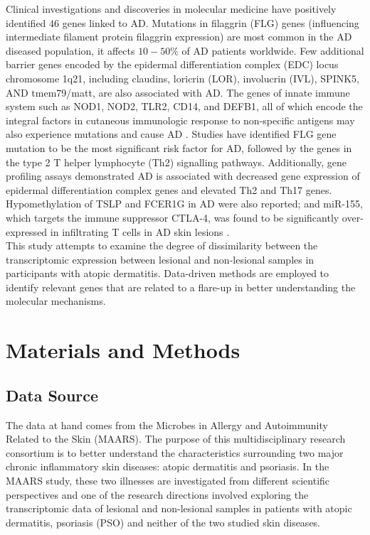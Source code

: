 \documentclass[journal, a4paper]{IEEEtran}
\begin{document}
Clinical investigations and discoveries in molecular medicine have positively identified $46$ genes linked to AD. Mutations in filaggrin (FLG) genes (influencing intermediate filament protein filaggrin expression) are most common in the AD diseased population, it affects $10-50\%$ of AD patients worldwide. Few additional barrier genes encoded by the epidermal differentiation complex (EDC) locus chromosome 1q21, including claudins, loricrin (LOR), involucrin (IVL), SPINK5, AND tmem79/matt, are also associated with AD. The genes of innate immune system such as NOD1, NOD2, TLR2, CD14, and DEFB1, all of which encode the integral factors in cutaneous immunologic response to non-specific antigens may also experience mutations and cause AD \cite{guttman2017atopic}. Studies have identified FLG gene mutation to be the most significant risk factor for AD, followed by the genes in the type 2 T helper lymphocyte (Th2) signalling pathways. Additionally, gene profiling assays demonstrated AD is associated with decreased gene expression of epidermal differentiation complex genes and elevated Th2 and Th17 genes. Hypomethylation of TSLP and FCER1G in AD were also reported; and miR-155, which targets the immune suppressor CTLA-4, was found to be significantly over-expressed in infiltrating T cells in AD skin lesions \cite{guttman2017atopic, bin2016genetic}.\\

This study attempts to examine the degree of dissimilarity between the transcriptomic expression between lesional and non-lesional samples in participants with atopic dermatitis. Data-driven methods are employed to identify relevant genes that are related to a flare-up in better understanding the molecular mechanisms.

\section{Materials and Methods}

\subsection{Data Source}

The data at hand comes from the Microbes in Allergy and Autoimmunity Related to the Skin (MAARS). The purpose of this multidisciplinary research consortium is to better understand the characteristics surrounding two major chronic inflammatory skin diseases: atopic dermatitis and psoriasis\cite{MAARS}. In the MAARS study, these two illnesses are investigated from different scientific perspectives and one of the research directions involved exploring the transcriptomic data of lesional and non-lesional samples in patients with atopic dermatitis, psoriasis (PSO) and neither of the two studied skin diseases.\\
\end{document}
